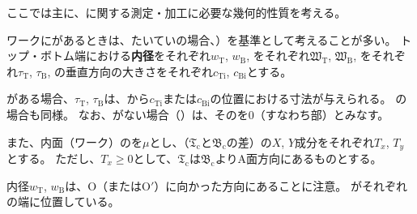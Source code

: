 

ここでは主に、\textbf{\Outcut}に関する測定・加工に必要な幾何的性質を考える。

ワークに\textbf{\Outcut}があるときは、たいていの場合、\textbf{\OutcutAsideThickness}）を基準として考えることが多い。
トップ・ボトム端における\textbf{内径}をそれぞれ$w_\mathrm T$, $w_\mathrm B$, \textbf{\OutcutWidth}をそれぞれ$\mathfrak W_\mathrm T$, $\mathfrak W_\mathrm B$, \OutcutAsideThickness をそれぞれ$\tau_\mathrm T$, $\tau_\mathrm B$, \EndFaceInCChamfer の垂直方向の大きさをそれぞれ$c_\mathrm{Ti}$, $c_\mathrm{Bi}$とする。
\begin{hosoku}
\EndFaceInCChamfer がある場合、\OutcutAsideThickness$\tau_\mathrm T$, $\tau_\mathrm B$は、\EndFace から\EndFaceInCChamferLength$c_\mathrm{Ti}$または$c_\mathrm{Bi}$の位置における寸法が与えられる。
\EndFaceInRChamferRadius の場合も同様。
なお、\EndFaceChamfer がない場合（）は、その\EndFaceChamferLength を0（すなわち\EndFace 部）とみなす。
\end{hosoku}
また、内面（ワーク）の\textbf{\PlatingThk}を$\mu$とし、\CenterlineEndFaceDif（\TopOutcutCenter$\mathfrak T_\mathrm c$と\BottomOutcutCenter$\mathfrak B_\mathrm c$の差）の$X$, $Y$成分をそれぞれ$T_x$, $T_y$とする。
ただし、$T_x \geq 0$として、\TopOutcutCenter$\mathfrak T_\mathrm c$は\BottomOutcutCenter$\mathfrak B_\mathrm c$よりA面方向にあるものとする。
\begin{hosoku}
内径$w_\mathrm T$, $w_\mathrm B$は、\CurvatureCenter O（またはO$'$）に向かった方向にあることに注意。
\IDCenter がそれぞれの端に位置している。
\end{hosoku}



